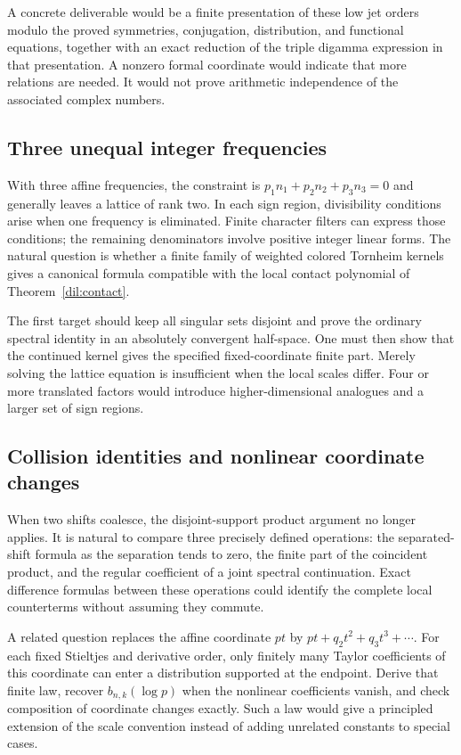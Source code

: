 A concrete deliverable would be a finite presentation of these low jet
orders modulo the proved symmetries, conjugation, distribution, and
functional equations, together with an exact reduction of the triple
digamma expression in that presentation.  A nonzero formal coordinate
would indicate that more relations are needed.  It would not prove
arithmetic independence of the associated complex numbers.

\subsection{Three unequal integer frequencies}

With three affine frequencies, the constraint is
$p_1n_1+p_2n_2+p_3n_3=0$ and generally leaves a lattice of rank two.
In each sign region, divisibility conditions arise when one frequency
is eliminated.  Finite character filters can express those conditions;
the remaining denominators involve positive integer linear forms.
The natural question is whether a finite family of weighted colored
Tornheim kernels gives a canonical formula compatible with the local
contact polynomial of Theorem~\ref{dil:contact}.

The first target should keep all singular sets disjoint and prove the
ordinary spectral identity in an absolutely convergent half-space.
One must then show that the continued kernel gives the specified
fixed-coordinate finite part.  Merely solving the lattice equation is
insufficient when the local scales differ.  Four or more translated
factors would introduce higher-dimensional analogues and a larger
set of sign regions.

\subsection{Collision identities and nonlinear coordinate changes}

When two shifts coalesce, the disjoint-support product argument no
longer applies.  It is natural to compare three precisely defined
operations: the separated-shift formula as the separation tends to
zero, the finite part of the coincident product, and the regular
coefficient of a joint spectral continuation.  Exact difference
formulas between these operations could identify the complete local
counterterms without assuming they commute.

A related question replaces the affine coordinate $pt$ by
$pt+q_2t^2+q_3t^3+\cdots$.  For each fixed Stieltjes and derivative
order, only finitely many Taylor coefficients of this coordinate can
enter a distribution supported at the endpoint.  Derive that finite
law, recover $b_{n,k}(\log p)$ when the nonlinear coefficients vanish,
and check composition of coordinate changes exactly.  Such a law
would give a principled extension of the scale convention instead of
adding unrelated constants to special cases.

